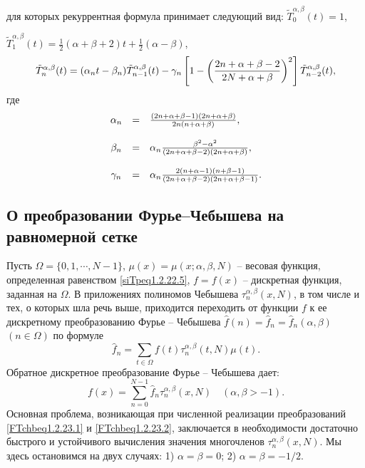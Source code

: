 для которых рекуррентная формула принимает следующий вид: $\tilde T_0^{\alpha,\beta}(t)=1$,

 $\tilde T_1^{\alpha,\beta}(t)=\frac12(\alpha+\beta+2)t+\frac12(\alpha-\beta)$,
\begin{equation}\label{siTpeq1.2.22.29}
\tilde
T_n^{\alpha,\beta}(t)= (\alpha_nt-\beta_n)\tilde
T_{n-1}^{\alpha,\beta}(t)-\gamma_n\left[1-\left({2n+\alpha+
\beta-2\over2N+\alpha+\beta}\right)^2\right]\tilde T_{n-2}^{\alpha,\beta}(t),
\end{equation}
где
 $$
 \begin{array}{crl}\alpha_n&=&{(2n+\alpha+\beta-1)(2n+\alpha+\beta)\over
2n(n+\alpha+\beta)},\\\\\beta_n&=&\alpha_n\frac{\beta^2-\alpha^2}{(2n+\alpha+\beta-2)
(2n+\alpha+\beta)},\\\\\gamma_n&=&
\alpha_n{2(n+\alpha-1)(n+\beta-1)\over(2n+\alpha+\beta-2)(2n+\alpha+\beta-1)}.\end{array}
$$

\subsection{О преобразовании Фурье--Чебышева на равномерной сетке}


 Пусть $\Omega=\{0,1,\cdots,N-1\}$, $\mu(x)=\mu(x;\alpha,\beta,N)$ -- весовая
функция, определенная равенством \eqref{siTpeq1.2.22.5}, $f=f(x)$ -- дискретная функция, заданная на $\Omega$. В приложениях полиномов Чебышева $\tau_n^{\alpha,\beta}(x,N)$, в том числе и тех, о которых шла речь выше,
приходится переходить от функции $f$ к ее дискретному преобразованию Фурье -- Чебышева $\hat f(n)=\hat f_n=\hat f_n(\alpha,\beta)$ $(n\in\Omega)$ по формуле
     \begin{equation}\label{FTchbeq1.2.23.1}
\hat f_n=\sum_{t\in\Omega}f(t)\tau_n^{\alpha,\beta}(t,N)\mu(t).
    \end{equation}
Обратное дискретное преобразование Фурье -- Чебышева дает:
    \begin{equation}\label{FTchbeq1.2.23.2}
f(x)=\sum_{n=0}^{N-1}\hat f_n\tau_n^{\alpha,\beta}(x,N)\quad (\alpha,\beta>-1).
    \end{equation}
Основная проблема, возникающая при численной реализации преобразований \eqref{FTchbeq1.2.23.1} и \eqref{FTchbeq1.2.23.2},
заключается в необходимости достаточно быстрого и устойчивого вычисления значения многочленов
$\tau_n^{\alpha,\beta}(x,N)$. Мы здесь остановимся на двух случаях: 1) $\alpha=\beta=0$; 2)
 $\alpha=\beta=-1/2$.


